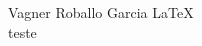 \documentclass[article,12pt,a4paper]{abntex2}
\begin{document}
Vagner Roballo Garcia \LaTeX{} \\

teste
\end{document}
